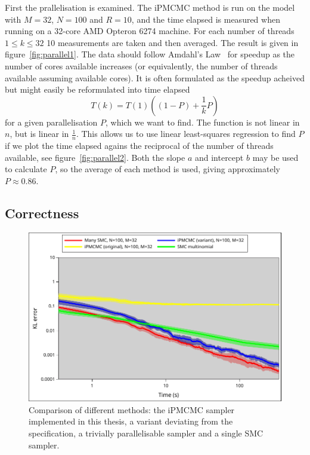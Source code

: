 First the prallelisation is examined. The iPMCMC method is run on the model with $M=32$, $N=100$ and $R=10$, and the time elapsed is measured when running on a 32-core AMD Opteron 6274 machine. For each number of threads $1 \leq k \leq 32$ 10 measurements are taken and then averaged. The result is given in figure~\ref{fig:parallel1}. The data should follow Amdahl's Law~\cite{amdahl} for speedup as the number of cores available increases (or equivalently, the number of threads available assuming available cores). It is often formulated as the speedup acheived but might easily be reformulated into time elapsed
\begin{equation}
    T(k) = T(1)\left((1-P) + \frac 1 k P\right)
\end{equation}
for a given parallelisation $P$, which we want to find. The function is not linear in $n$, but is linear in $\frac 1 n$. This allows us to use linear least-squares regression to find $P$ if we plot the time elapsed agains the reciprocal of the number of threads available, see figure~\ref{fig:parallel2}. Both the slope $a$ and intercept $b$ may be used to calculate $P$, so the average of each method is used, giving approximately $P \approx 0.86$.

\subsection{Correctness}
\label{sub:correctness}

\begin{figure}[h]
    \centering
    \includegraphics[width=\linewidth]{figures/correctness.pdf}
    \caption{Comparison of different methods: the \mbox{iPMCMC} sampler implemented in this thesis, a variant deviating from the specification, a trivially parallelisable sampler and a single SMC sampler.}
    \label{fig:corr}
\end{figure}

